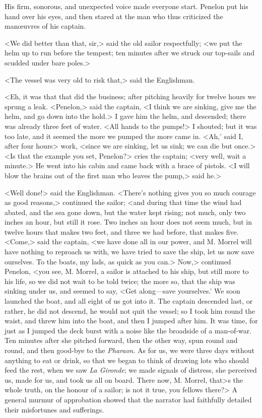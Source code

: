  His firm, sonorous, and unexpected voice made everyone start. Penelon put his hand over his eyes, and then stared at the man who thus criticized the manœuvres of his captain. 

 <We did better than that, sir,> said the old sailor respectfully; <we put the helm up to run before the tempest; ten minutes after we struck our top-sails and scudded under bare poles.> 

 <The vessel was very old to risk that,> said the Englishman. 

 <Eh, it was that that did the business; after pitching heavily for twelve hours we sprung a leak. <Penelon,> said the captain, <I think we are sinking, give me the helm, and go down into the hold.> I gave him the helm, and descended; there was already three feet of water. <All hands to the pumps!> I shouted; but it was too late, and it seemed the more we pumped the more came in. <Ah,' said I, after four hours> work, <since we are sinking, let us sink; we can die but once.> <Is that the example you set, Penelon?> cries the captain; <very well, wait a minute.> He went into his cabin and came back with a brace of pistols. <I will blow the brains out of the first man who leaves the pump,> said he.> 

 <Well done!> said the Englishman.  <There's nothing gives you so much courage as good reasons,> continued the sailor; <and during that time the wind had abated, and the sea gone down, but the water kept rising; not much, only two inches an hour, but still it rose. Two inches an hour does not seem much, but in twelve hours that makes two feet, and three we had before, that makes five. <Come,> said the captain, <we have done all in our power, and M. Morrel will have nothing to reproach us with, we have tried to save the ship, let us now save ourselves. To the boats, my lads, as quick as you can.> Now,> continued Penelon, <you see, M. Morrel, a sailor is attached to his ship, but still more to his life, so we did not wait to be told twice; the more so, that the ship was sinking under us, and seemed to say, <Get along—save yourselves.' We soon launched the boat, and all eight of us got into it. The captain descended last, or rather, he did not descend, he would not quit the vessel; so I took him round the waist, and threw him into the boat, and then I jumped after him. It was time, for just as I jumped the deck burst with a noise like the broadside of a man-of-war. Ten minutes after she pitched forward, then the other way, spun round and round, and then good-bye to the \textit{Pharaon}. As for us, we were three days without anything to eat or drink, so that we began to think of drawing lots who should feed the rest, when we saw \textit{La Gironde}; we made signals of distress, she perceived us, made for us, and took us all on board. There now, M. Morrel, that>s the whole truth, on the honour of a sailor; is not it true, you fellows there?> A general murmur of approbation showed that the narrator had faithfully detailed their misfortunes and sufferings. 

